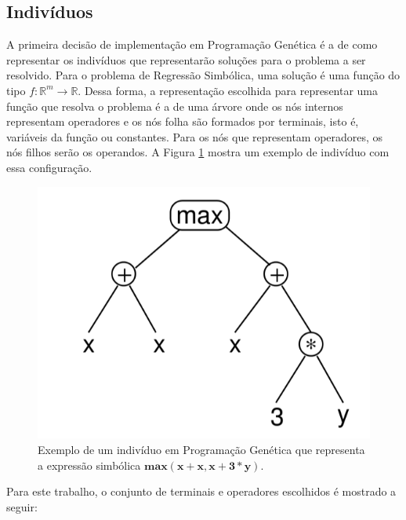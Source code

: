 \documentclass[12pt]{article}
\begin{document}
\subsection{Indivíduos} \label{sec:ind}

A primeira decisão de implementação em Programação Genética é a de como representar
os indivíduos que representarão soluções para o problema a ser resolvido. Para o
problema de Regressão Simbólica, uma solução é uma função do tipo
$ f:\mathbb{R}^{m} \rightarrow \mathbb{R} $. Dessa forma, a representação escolhida
para representar uma função que resolva o problema é a de uma árvore onde os nós
internos representam operadores e os nós folha são formados por terminais, isto é,
variáveis da função ou constantes. Para os nós que representam operadores, os nós filhos
serão os operandos. A Figura \ref{fig:gp_ind} mostra um exemplo de indivíduo com essa
configuração.

\begin{figure}[ht]
\centering
\includegraphics[width=.7\textwidth]{gp_ind.png}
\caption{Exemplo de um indivíduo em Programação Genética que representa a expressão
simbólica $\mathbf{max(x+x, x+3*y)}$.}
\label{fig:gp_ind}
\end{figure}

Para este trabalho, o conjunto de terminais e operadores escolhidos é mostrado a seguir:
\end{document}

